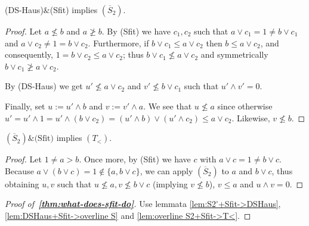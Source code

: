 \begin{lem} \label{lem:DSHaus+Sfit->overline S}
  (DS-Haus)$\&$(Sfit) implies $(\overline{S}_2)$.
\end{lem}
\begin{proof}
  Let $a\not\le b$ and $a\not\ge b$.
  By (Sfit) we have $c_1, c_2$ such that $a \vee c_1 = 1 \ne b \vee c_1$ and $a
  \vee c_2 \ne 1 = b \vee c_2$.
  Furthermore, if $b \vee c_1 \le a \vee c_2$ then $b \le a \vee c_2$, and
  consequently, $1 = b \vee c_2 \le a \vee c_2$;
  thus $b \vee c_1 \not\le a \vee c_2$ and symmetrically $b \vee c_1 \not\ge a
  \vee c_2$.

  By (DS-Haus) we get $u'\not\le a \vee c_2$ and $v'\not\le b \vee c_1$ such
  that $u' \wedge v' = 0$.

  Finally, set $u := u' \wedge b$ and $v := v' \wedge a$.
  We see that $u\not\le a$ since otherwise $u' = u' \wedge 1 = u' \wedge (b
  \vee c_2) = (u' \wedge b) \vee (u' \wedge c_2) \le a \vee c_2$.
  Likewise, $v\not\le b$.
\end{proof}

\begin{lem} \label{lem:overline S2+Sfit->T<}
  $(\overline{S}_2)\&\text{(Sfit)}$ implies $(T_<)$.
\end{lem}
\begin{proof}
  Let $1 \ne a > b$.
  Once more, by (Sfit) we have $c$ with $a \vee c = 1 \ne b \vee c$.
  Because $a \vee (b \vee c) = 1 \not\in \{ a, b \vee c \}$, we can apply
  $(\overline{S}_2)$ to $a$ and $b \vee c$, thus obtaining $u, v$ such that
  $u\not\le a, v\not\le b \vee c$ (implying $v\not\le b$), $v \le a$ and $u
  \wedge v = 0$.
\end{proof}

\begin{proof}[Proof of~{\bf \ref{thm:what-does-sfit-do}}]
  Use lemmata \ref{lem:S2'+Sfit->DSHaus}, \ref{lem:DSHaus+Sfit->overline S} and
  \ref{lem:overline S2+Sfit->T<}.
\end{proof}
